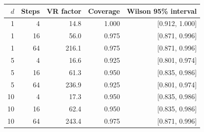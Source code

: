 \begin{tabular}{rrrrr}
\toprule
$d$ & Steps & VR factor & Coverage & Wilson 95\% interval \\
\midrule
1 & 4 & 14.8 & 1.000 & [0.912, 1.000] \\
1 & 16 & 56.0 & 0.975 & [0.871, 0.996] \\
1 & 64 & 216.1 & 0.975 & [0.871, 0.996] \\
5 & 4 & 16.6 & 0.925 & [0.801, 0.974] \\
5 & 16 & 61.3 & 0.950 & [0.835, 0.986] \\
5 & 64 & 236.9 & 0.925 & [0.801, 0.974] \\
10 & 4 & 17.3 & 0.950 & [0.835, 0.986] \\
10 & 16 & 62.4 & 0.950 & [0.835, 0.986] \\
10 & 64 & 243.4 & 0.975 & [0.871, 0.996] \\
\bottomrule
\end{tabular}
